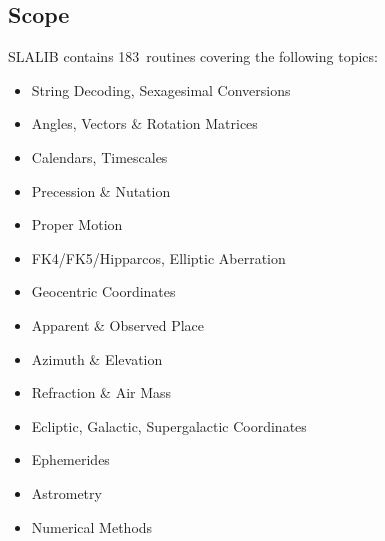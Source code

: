 \documentclass[11pt,twoside]{article}
\newcommand{\nroutines} {183}
\begin{document}
\subsection{Scope}
SLALIB contains \nroutines\ routines covering the following topics:
\begin{itemize}
\item String Decoding,
      Sexagesimal Conversions
\item Angles, Vectors \& Rotation Matrices
\item Calendars,
      Timescales
\item Precession \& Nutation
\item Proper Motion
\item FK4/FK5/Hipparcos,
      Elliptic Aberration
\item Geocentric Coordinates
\item Apparent \& Observed Place
\item Azimuth \& Elevation
\item Refraction \& Air Mass
\item Ecliptic,
      Galactic,
      Supergalactic Coordinates
\item Ephemerides
\item Astrometry
\item Numerical Methods
\end{itemize}
\end{document}

